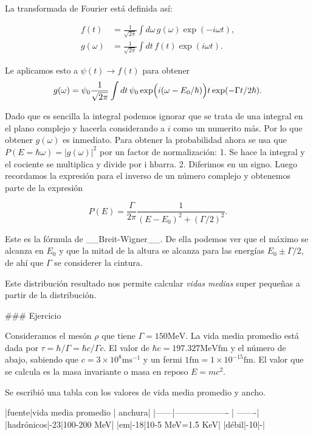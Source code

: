 La transformada de Fourier está definida así:

$$
\begin{align*}
  f(t) &= \frac{1}{\sqrt{2\pi}} \int d\omega \, g(\omega)
  \exp(-i\omega t),\\
  g(\omega) &= \frac{1}{\sqrt{2\pi}} \int dt \, f(t)
  \exp(i\omega t).
\end{align*}
$$

Le aplicamos esto a $\psi(t) \to f(t)$ para obtener
$$
g(\omega) = \psi_0 \frac{1}{\sqrt{2\pi}} \int dt\,\psi_0
\exp\Bigl(i(\omega - E_0/\hbar)\Bigr)t \exp(-\Gamma
t/2\hbar).
$$

Dado que es sencilla la integral podemos ignorar que se
trata de una integral en el plano complejo y hacerla
considerando a $i$ como un numerito más. Por lo que obtener
$g(\omega)$ es inmediato. Para obtener la probabilidad ahora
se usa que $P(E=\hbar\omega) = \vert g(\omega)\vert^2$ por
un factor de normalización:
1. Se hace la integral y el cociente se multiplica y divide  por i hbarra.
2. Diferimos en un signo. Luego recordamos la expresión para el inverso de un número complejo y
obtenemos parte de la expresión

$$
P(E) = \frac{\Gamma}{2\pi}\frac{1}{(E-E_0)^2 +
(\Gamma/2)^2}.$$

Este es la fórmula de
__Breit-Wigner__. De ella podemos ver que el máximo se
alcanza en $E_0$ y que la mitad de la altura se alcanza para
las energías $E_0 \pm \Gamma/2$, de ahí que $\Gamma$ se
considerer la cintura.

Este distribución resultado nos permite calcular \emph{vidas
medias} super pequeñas a partir de la distribución. %

### Ejercicio

Consideramos el mesón $\rho$ que tiene $\Gamma = 150
\mathrm{MeV}$. La vida media promedio está dada por $\tau =
\hbar/\Gamma = \hbar c / \Gamma c$. El valor de $\hbar c =
197.327 \mathrm{MeV fm}$ y el número de abajo, sabiendo que
$c = 3\times10^{8} \mathrm{ms}^{-1}$ y un fermi $1
\mathrm{fm} = 1\times10^{-15}\mathrm{fm}$. El valor que se
calcula es la masa invariante o masa en reposo $E = mc^2$.

Se escribió una tabla con los valores de vida media promedio
y ancho.

|fuente|vida media promedio | anchura|
|------|------------------- | -------|
|hadrónicos|-23|100-200 MeV|
|em|-18|10-5 MeV=1.5 KeV|
|débil|-10|-|
